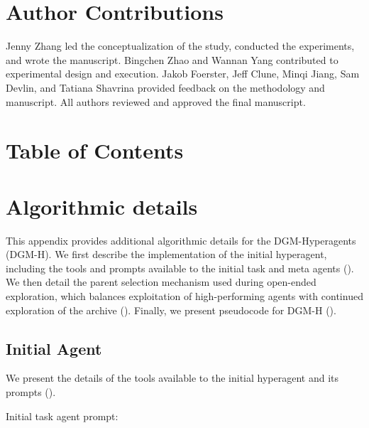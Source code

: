 \documentclass[]{fairmeta}
\begin{document}
\section*{Author Contributions}
Jenny Zhang led the conceptualization of the study, conducted the experiments, and wrote the manuscript. Bingchen Zhao and Wannan Yang contributed to experimental design and execution. Jakob Foerster, Jeff Clune, Minqi Jiang, Sam Devlin, and Tatiana Shavrina provided feedback on the methodology and manuscript. All authors reviewed and approved the final manuscript.




\clearpage

\beginappendix

\section*{Table of Contents}
\startcontents[sections]
\clearpage


\section{Algorithmic details}
\label{app:algo-details}

This appendix provides additional algorithmic details for the DGM-Hyperagents (DGM-H). We first describe the implementation of the initial hyperagent, including the tools and prompts available to the initial task and meta agents (). We then detail the parent selection mechanism used during open-ended exploration, which balances exploitation of high-performing agents with continued exploration of the archive (). Finally, we present pseudocode for DGM-H ().

\subsection{Initial Agent}
\label{app:initial-agent}

We present the details of the tools available to the initial hyperagent and its prompts ().

Initial task agent prompt:

\end{document}
